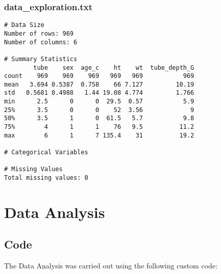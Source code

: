 \documentclass[11pt]{article}
\begin{document}
\subsubsection*{data\_exploration.txt}

\begin{Verbatim}[tabsize=4]
# Data Size
Number of rows: 969
Number of columns: 6

# Summary Statistics
        tube    sex  age_c    ht    wt  tube_depth_G
count    969    969    969   969   969           969
mean   3.694 0.5387  0.758    66 7.127         10.19
std   0.5681 0.4988   1.44 19.08 4.774         1.766
min      2.5      0      0  29.5  0.57           5.9
25%      3.5      0      0    52  3.56             9
50%      3.5      1      0  61.5   5.7           9.8
75%        4      1      1    76   9.5          11.2
max        6      1      7 135.4    31          19.2

# Categorical Variables

# Missing Values
Total missing values: 0

\end{Verbatim}

\section{Data Analysis}
\subsection{{Code}}
The Data Analysis was carried out using the following custom code:
\end{document}
